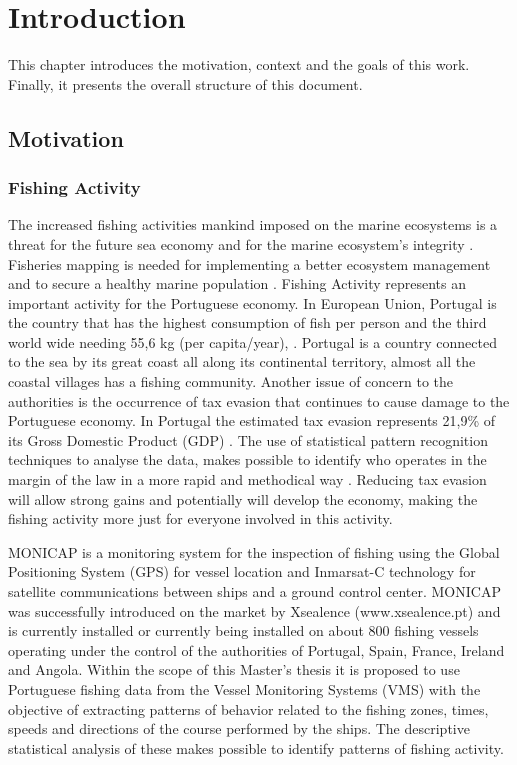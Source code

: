 % 
%  
%
\chapter{Introduction}
\label{cha:introduction}
This chapter introduces the motivation, context and the goals of this work. Finally, it presents the overall structure of this document.

\section{Motivation} %
\label{sec:motivation}

\subsection{Fishing Activity} %
\label{sub:fishing_activity}
The increased fishing activities mankind imposed on the marine ecosystems is a threat for the future sea economy and for the marine ecosystem’s integrity \cite{AgardyEffects}.\\
Fisheries mapping is needed for implementing a better ecosystem management and to secure a healthy marine population \cite{AlfredImperative}.
Fishing Activity represents an important activity for the Portuguese economy. In European Union, Portugal is the country that has the highest consumption of fish per person and the third world wide needing 55,6 kg (per capita/year), \cite{WEBSITE:ConsumoPescasPortugal}. Portugal is a country connected to the sea by its great coast all along its continental territory, almost all the coastal villages has a fishing community.
Another issue of concern to the authorities is the occurrence of tax evasion that continues to cause damage to the Portuguese economy. In Portugal the estimated tax evasion represents 21,9\% of its Gross Domestic Product (GDP) \cite{BOOK:EsbocoFraude}.
The use of statistical pattern recognition techniques to analyse the data, makes possible to identify who operates in the margin of the law in a more rapid and methodical way \cite{ShuklaBigData}. Reducing tax evasion will allow strong gains and potentially will develop the economy, making the fishing activity more just for everyone involved in this activity.

MONICAP is a monitoring system for the inspection of fishing using the Global Positioning System (GPS) for vessel location and Inmarsat-C technology for satellite communications between ships and a ground control center. MONICAP was successfully introduced on the market by Xsealence (www.xsealence.pt) and is currently installed or currently being installed on about 800 fishing vessels operating under the control of the authorities of Portugal, Spain, France, Ireland and Angola. Within the scope of this Master's thesis it is proposed to use Portuguese fishing data from the Vessel Monitoring Systems (VMS) with the objective of extracting patterns of behavior related to the fishing zones, times, speeds and directions of the course performed by the ships. The descriptive statistical analysis of these makes possible to identify patterns of fishing activity. 

